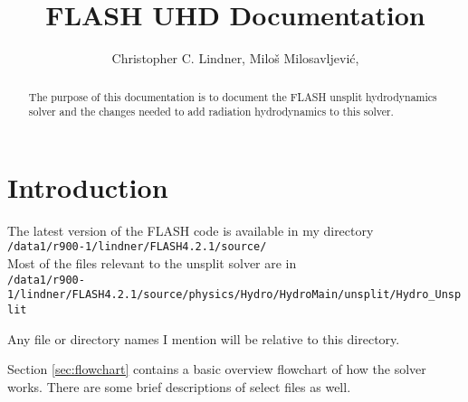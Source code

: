 \documentclass[preprint,11pt]{aastex}
\begin{document}
	

\title{FLASH UHD Documentation}
\author{
Christopher C. Lindner,
Milo\v s Milosavljevi\'c,
}


\begin{abstract}
The purpose of this documentation is to document the FLASH unsplit hydrodynamics solver and the changes needed to add radiation hydrodynamics to this solver.

\keywords{ }


\end{abstract}

\section{Introduction}
\label{sec:intro}
\setcounter{footnote}{0}

The latest version of the FLASH code is available in my directory \\
\verb!/data1/r900-1/lindner/FLASH4.2.1/source/! \\

Most of the files relevant to the unsplit solver are in \\
\verb!/data1/r900-1/lindner/FLASH4.2.1/source/physics/Hydro/HydroMain/unsplit/Hydro_Unsplit!

Any file or directory names I mention will be relative to this directory.

Section \ref{sec:flowchart} contains a basic overview flowchart of how the solver works.  There are some brief descriptions of select files as well.
\end{document}
